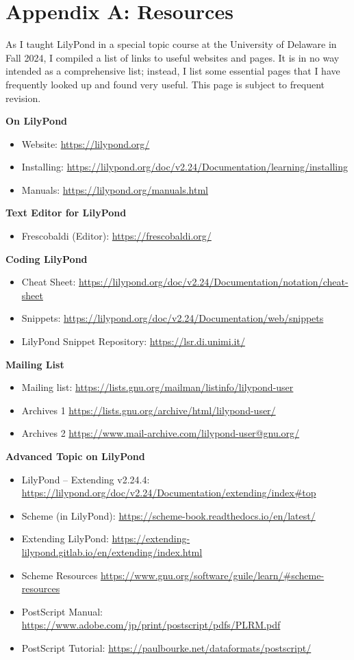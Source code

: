 
\chapter{Appendix A: Resources}

As I taught LilyPond in a special topic course at the University of Delaware in Fall 2024, I compiled a list of links to useful websites and pages. It is in no way intended as a comprehensive list; instead, I list some essential pages that I have frequently looked up and found very useful. This page is subject to frequent revision.

\textbf{On LilyPond}
\begin{itemize}
\item Website:	\url{https://lilypond.org/}
\item Installing: \url{https://lilypond.org/doc/v2.24/Documentation/learning/installing}
\item Manuals: \url{https://lilypond.org/manuals.html} 
\end{itemize}
\textbf{Text Editor for LilyPond}
\begin{itemize}
\item Frescobaldi (Editor):	\url{https://frescobaldi.org/}
\end{itemize}
\textbf{Coding LilyPond}
\begin {itemize}
\item Cheat Sheet:	\url{https://lilypond.org/doc/v2.24/Documentation/notation/cheat-sheet}
\item Snippets:	\url{https://lilypond.org/doc/v2.24/Documentation/web/snippets}
\item LilyPond Snippet Repository:	\url{https://lsr.di.unimi.it/}
\end{itemize}
\textbf{Mailing List}
\begin {itemize}
\item Mailing list:		\url{https://lists.gnu.org/mailman/listinfo/lilypond-user} 
\item Archives 1 \url{https://lists.gnu.org/archive/html/lilypond-user/}
\item Archives 2 \url{https://www.mail-archive.com/lilypond-user@gnu.org/} 
\end{itemize}
\textbf{Advanced Topic on LilyPond}
\begin {itemize}
\item LilyPond – Extending v2.24.4: \url{https://lilypond.org/doc/v2.24/Documentation/extending/index#top} 
\item Scheme (in LilyPond):	\url{https://scheme-book.readthedocs.io/en/latest/} 
\item Extending LilyPond: \url{https://extending-lilypond.gitlab.io/en/extending/index.html}
\item Scheme Resources \url{https://www.gnu.org/software/guile/learn/#scheme-resources}
\item PostScript Manual: \url{https://www.adobe.com/jp/print/postscript/pdfs/PLRM.pdf}
\item PostScript Tutorial: \url{https://paulbourke.net/dataformats/postscript/}
\end{itemize}
